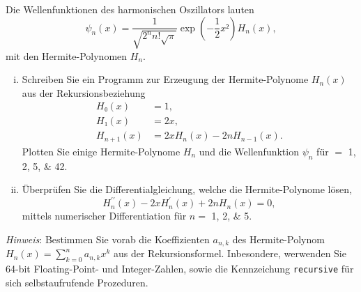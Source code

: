 \begin{question}[subtitle=Harmonischer Oszillator]
  Die Wellenfunktionen des harmonischen Oszillators lauten
  \begin{equation}
   ψ_n(x) = \frac{1}{\sqrt{2^n n! \sqrt{π}}} \exp \left( -\frac{1}{2}x² \right) H_n(x),
  \end{equation}
  mit den Hermite-Polynomen $H_n$.
  \begin{enumerate}[(i)]
  \item Schreiben Sie ein Programm zur Erzeugung der Hermite-Polynome $H_n(x)$ aus der Rekursionsbeziehung
    \begin{align}
      H₀ (x) & = 1,\\
      H₁ (x) & = 2x, \\
      H_{n + 1} (x) & = 2x H_n(x) - 2n H_{n - 1} (x).
    \end{align}
    Plotten Sie einige Hermite-Polynome $H_n$ und die Wellenfunktion $ψ_n$ für $
    =$ \numlist{1;2;5;42}.
  \item Überprüfen Sie die Differentialgleichung, welche die Hermite-Polynome lösen,
    \begin{equation}
     H^{\prime\prime}_{n} (x) - 2x H^{\prime}_n(x) + 2nH_n(x) = 0,
   \end{equation}
   mittels numerischer Differentiation für $n =$ \numlist{1;2;5}.
  \end{enumerate}
  \textit{Hinweis}: Bestimmen Sie vorab die Koeffizienten $a_{n, k}$ des Hermite-Polynom $H_{n}(x) = ∑_{k = 0}^n a_{n, k} x^k$ aus der Rekursionsformel. Inbesondere, werwenden Sie 64-bit Floating-Point- und Integer-Zahlen, sowie die Kennzeichung \texttt{recursive} für sich selbstaufrufende Prozeduren.
\end{question}
